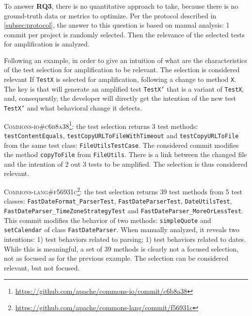 
\subsubsection{\rqselection}
\label{subsubsec:dci:evaluation:rq3}

To answer \textbf{RQ3}, there is no quantitative approach to take, because there is no ground-truth data or metrics to optimize. 
Per the protocol described in \autoref{subsec:protocol}, the answer to this question is based on manual analysis:
1 commit per project is randomly selected.
Then the relevance of the selected tests for amplification is analyzed.

Following an example, in order to give an intuition of what are the characteristics of the test selection for amplification to be relevant.
The selection is considered relevant If \texttt{TestX} is selected for amplification, following a change to method \texttt{X}.
The key is that \DCI will generate an amplified test \texttt{TestX'} that is a variant of \texttt{TestX}, and, consequently, the developer will directly get the intention of the new test \texttt{TestX'} and what behavioral change it detects.

\textsc{Commons-io\#c6b8a38}\footnote{\url{https://github.com/apache/commons-io/commit/c6b8a38}}: the test selection returns 3 test methods: \texttt{testContentEquals}, \texttt{testCopyURLToFileWithTimeout} and \texttt{testCopyURLToFile} from the same test class: \texttt{FileUtilsTestCase}.
The considered commit modifies the method \texttt{copyToFile} from \texttt{FileUtils}.
There is a link between the changed file and the intention of 2 out 3 tests to be amplified.
The selection is thus considered relevant.

\textsc{Commons-lang\#f56931c}\footnote{\url{https://github.com/apache/commons-lang/commit/f56931c}}: the test selection returns 39 test methods from 5 test classes: \texttt{FastDateFormat\_ParserTest}, \texttt{FastDateParserTest}, \texttt{DateUtilsTest}, \texttt{FastDateParser\_TimeZoneStrategyTest} and \texttt{FastDateParser\_MoreOrLessTest}.
This commit modifies the behavior of two methods: \texttt{simpleQuote} and \texttt{setCalendar} of class \texttt{FastDateParser}.
When manually analyzed, it reveals two intentions:
1) test behaviors related to parsing;
1) test behaviors related to dates.
While this is meaningful, a set of 39 methods is clearly not a focused selection, not as focused as for the previous example.
The selection can be considered relevant, but not focused.

